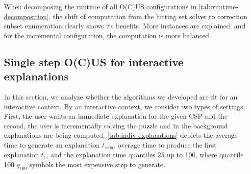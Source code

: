\documentclass[a4paper,UKenglish,cleveref, autoref, thm-restate, pdfa]{lipics-v2021}
\begin{document}
			When decomposing the runtime of all O(C)US configurations in \cref{tab:runtime-decomposition}, the shift of computation from the hitting set solver to correction subset enumeration clearly shows its benefits.
			More instances are explained, and for the incremental configuration, the computation is more balanced. 
			
			
				
				
				
				\subsection{Single step O(C)US for interactive explanations}
				
				In this section, we analyze whether the algorithms we developed are fit for an interactive context. By an interactive context, we consider two types of settings. First, the user wants an immediate explanation for the given CSP and the second, the user is incrementally solving the puzzle and in the background explanations are being computed. \cref{tab:indiv-explanations} depicts the average time to generate an explanation $\overline{t_{expl}}$, average time to produce the first explanation $\overline{t_{1}}$, and the explanation time quantiles 25 up to 100, where quantile 100 $q_{100}$ symbols the most expensive step to generate.
				
\end{document}

